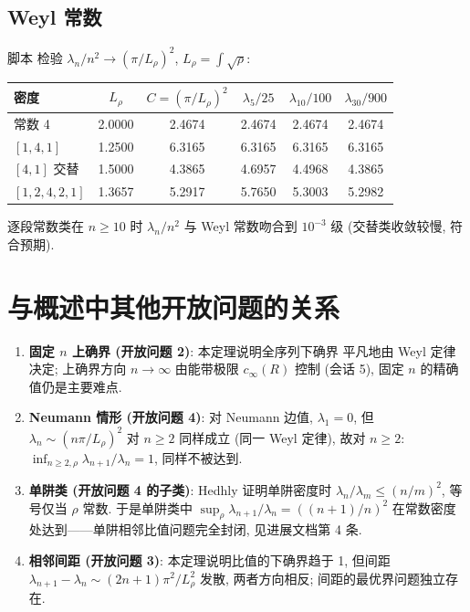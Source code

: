 \documentclass[UTF8]{ctexart}
\begin{document}
\subsection{Weyl 常数}

脚本  检验
$\lambda_n / n^2 \to (\pi/L_\rho)^2$, $L_\rho = \int\sqrt\rho$:
\begin{center}
\begin{tabular}{lccccc}
	\toprule
	密度 & $L_\rho$ & $C = (\pi/L_\rho)^2$ & $\lambda_5/25$ & $\lambda_{10}/100$ & $\lambda_{30}/900$ \\
	\midrule
	常数 4 & 2.0000 & 2.4674 & 2.4674 & 2.4674 & 2.4674 \\
	$[1,4,1]$ & 1.2500 & 6.3165 & 6.3165 & 6.3165 & 6.3165 \\
	$[4,1]$ 交替 & 1.5000 & 4.3865 & 4.6957 & 4.4968 & 4.3865 \\
	$[1,2,4,2,1]$ & 1.3657 & 5.2917 & 5.7650 & 5.3003 & 5.2982 \\
	\bottomrule
\end{tabular}
\end{center}
逐段常数类在 $n \ge 10$ 时 $\lambda_n/n^2$ 与 Weyl 常数吻合到 $10^{-3}$ 级
(交替类收敛较慢, 符合预期).

\section{与概述中其他开放问题的关系}

\begin{enumerate}
	\item \textbf{固定 $n$ 上确界 (开放问题 2)}: 本定理说明全序列下确界
		平凡地由 Weyl 定律决定; 上确界方向 $n \to \infty$ 由能带极限
		$c_\infty(R)$ 控制 (会话 5), 固定 $n$ 的精确值仍是主要难点.
	\item \textbf{Neumann 情形 (开放问题 4)}: 对 Neumann 边值,
		$\lambda_1 = 0$, 但 $\lambda_n \sim (n\pi/L_\rho)^2$ 对 $n \ge 2$
		同样成立 (同一 Weyl 定律), 故对 $n \ge 2$:
		$\inf_{n \ge 2, \rho} \lambda_{n+1}/\lambda_n = 1$, 同样不被达到.
	\item \textbf{单阱类 (开放问题 4 的子类)}: Hedhly \cite{hedhly}
		证明单阱密度时 $\lambda_n/\lambda_m \le (n/m)^2$, 等号仅当 $\rho$
		常数. 于是单阱类中 $\sup_\rho \lambda_{n+1}/\lambda_n =
		((n+1)/n)^2$ 在常数密度处达到——单阱相邻比值问题完全封闭,
		见进展文档第 4 条.
	\item \textbf{相邻间距 (开放问题 3)}: 本定理说明比值的下确界趋于 1,
		但间距 $\lambda_{n+1} - \lambda_n \sim (2n+1)\pi^2/L_\rho^2$ 发散,
		两者方向相反; 间距的最优界问题独立存在.
\end{enumerate}
\end{document}

